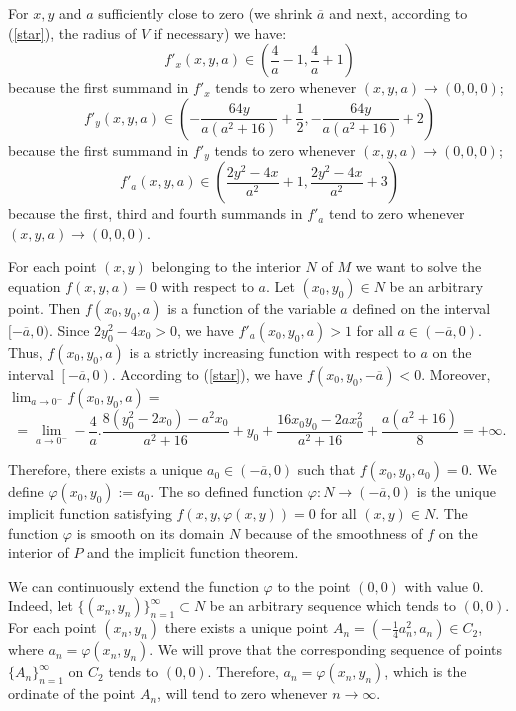 \documentclass[a4paper]{article}
\begin{document}
For $x,y$ and $a$ sufficiently close to zero (we shrink $\overline{a}$ and next, according to (\ref{star}), the radius of $V$  if necessary) we have:
\begin{equation}\label{estimate1}
    f'_x(x,y,a) \in \left(\frac{4}{a}-1,\frac{4}{a}+1\right)
\end{equation} because the first summand in $f'_x$ tends to zero whenever $(x,y,a) \to (0,0,0)$;
\begin{equation}\label{estimate2}
    f'_y(x,y,a) \in \left(-\frac{64y}{a(a^2+16)}+\frac{1}{2},-\frac{64y}{a(a^2+16)}+2\right)
\end{equation} because the first summand in $f'_y$ tends to zero whenever $(x,y,a) \to (0,0,0)$;
\begin{equation}\label{estimate3}
    f'_a(x,y,a) \in \left(\frac{2y^2-4x}{a^2}+1,\frac{2y^2-4x}{a^2}+3\right)
\end{equation} because the first, third and fourth summands in $f'_a$ tend to zero whenever $(x,y,a) \to (0,0,0)$.

For each point $(x,y)$ belonging to the interior $N$ of $M$ we want to solve the equation $f(x,y,a)=0$ with respect to $a$. Let $(x_0,y_0) \in N$ be an arbitrary point. Then $f(x_0,y_0,a)$ is a function of the variable $a$ defined on the interval $[-\overline{a},0)$. Since $2y_0^2-4x_0 > 0$, we have $f'_a(x_0,y_0,a) > 1$ for all $a \in \left(-\overline{a},0\right)$. Thus, $f(x_0,y_0,a)$ is a strictly increasing function with respect to $a$ on the interval $\left[-\overline{a},0\right)$. According to (\ref{star}), we have $f(x_0,y_0,-\overline{a}) < 0$. Moreover,  $\lim_{a \to 0^-} f(x_0,y_0,a) =$ $$  =\lim_{a \to 0^-} -\frac{4}{a} . \frac{8(y_0^2-2x_0)-a^2 x_0}{a^2+16} + y_0 + \frac{16x_0y_0-2ax_0^2}{a^2+16} + \frac{a(a^2+16)}{8} = +\infty.$$

Therefore, there exists a unique $a_0 \in (-\overline{a},0)$ such that $f(x_0,y_0,a_0)=0$. We define $\varphi(x_0,y_0):=a_0$. 
The so defined function $\varphi:N \longrightarrow \left(-\overline{a},0\right)$ is the unique implicit function satisfying
$f(x,y,\varphi(x,y))=0$ for all $(x,y) \in N$. 
The function $\varphi$ is smooth on its domain $N$ because of the smoothness of $f$ on the interior of $P$ and the implicit function theorem.

We can continuously extend the function $\varphi$ to the point $(0,0)$ with value $0$. Indeed, let $\{(x_n,y_n)\}_{n=1}^{\infty} \subset N$ be an arbitrary sequence which tends to $(0,0)$. For each point $(x_n,y_n)$ there exists a unique point $A_n=(-\frac{1}{4}a_n^2,a_n) \in C_2$, where $a_n = \varphi(x_n,y_n)$. We will prove that the corresponding sequence of points $\{A_n\}_{n=1}^{\infty}$ on $C_2$ tends to $(0,0)$. Therefore, $a_n = \varphi(x_n,y_n)$, which is the ordinate of the point $A_n$, will tend to zero whenever $n \to \infty$.
\end{document}
